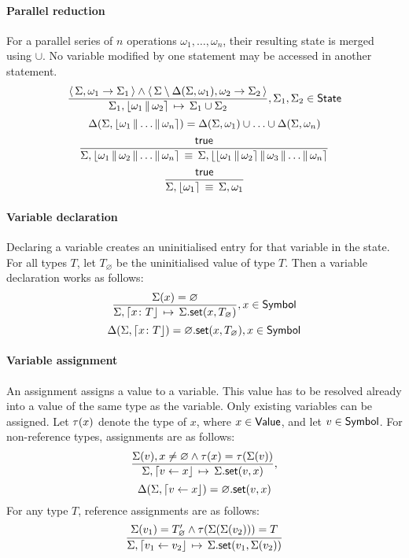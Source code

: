 \paragraph{Parallel reduction}
For a parallel series of $n$ operations $\omega_1, \ldots, \omega_n$, their resulting state is merged using $\cup$.
No variable modified by one statement may be accessed in another statement.
$$
	\semrule{
		\results{\Sigma}{\omega_1}{\Sigma_1} \land
		\results{\Sigma \setminus \Delta(\Sigma, \omega_1)}{\omega_2}{\Sigma_2}}
		{\Sigma_1, \parstmt{\omega_1}{\omega_2}}
		{\Sigma_1 \cup \Sigma_2},
			\Sigma_1, \Sigma_2 \in \State
$$
$$
	\Delta(\Sigma, \parstmt{\omega_1}{\ldots}{\omega_n}) = \Delta(\Sigma, \omega_1) \cup \ldots \cup \Delta(\Sigma, \omega_n)
$$
$$
	\semruleeq{\true}
		{\Sigma, \parstmt{\omega_1}{\omega_2}{\ldots}{\omega_n}}
		{\Sigma, \parstmt{\parstmt{\omega_1}{\omega_2}}{\omega_3}{\ldots}{\omega_n}}
$$
$$
\semruleeq{\true}
	{\Sigma, \parstmt{\omega_1}}
	{\Sigma, \omega_1}
$$

\paragraph{Variable declaration}
Declaring a variable creates an uninitialised entry for that variable in the state.
For all types $T$, let $T_\varnothing$ be the uninitialised value of type $T$.
Then a variable declaration works as follows:
$$
\semrule
	{\Sigma(x) = \varnothing}
	{\Sigma, \stmt{\varv{x}{T}}}
	{\StSet{\Sigma}{x}{T_\varnothing}},
		x \in \Symbol
$$
$$
\Delta(\Sigma, \stmt{\varv{x}{T}}) = \StSet{\varnothing}{x}{T_\varnothing},
                x \in \Symbol
$$

\paragraph{Variable assignment}
An assignment assigns a value to a variable.
This value has to be resolved already into a value of the same type as the variable.
Only existing variables can be assigned.
Let $\tau(x)$ denote the type of $x$, where $x \in \mathsf{Value}$, and let $v \in \mathsf{Symbol}$.
For non-reference types, assignments are as follows:
$$
\semrule
	{\Sigma(v), x \neq \varnothing \land
		\typeof{x} = \typeof{\Sigma(v)}}
	{\Sigma, \stmt{v \gets x}}
	{\StSet{\Sigma}{v}{x}},
$$
$$
\Delta(\Sigma, \stmt{v \gets x}) = \StSet{\varnothing}{v}{x}
$$
For any type $T$, reference assignments are as follows:
$$
\semrule
	{\Sigma(v_1) = \reft{T}_\varnothing \land
		\typeof{\Sigma(\Sigma(v_2))} = T}
	{\Sigma, \stmt{v_1 \gets v_2}}
	{\StSet{\Sigma}{v_1}{\Sigma(v_2)}}
$$

